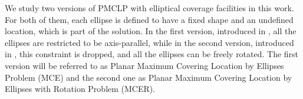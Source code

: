 We study two versions of PMCLP with elliptical coverage facilities in this work. For both of them, each ellipse is defined to have a fixed shape and an undefined location, which is part of the solution.
In the first version, introduced in \cite{canbolat}, all the ellipses are restricted to be axis-parallel, while in the second version, introduced in \cite{andreta}, this constraint is dropped, and all the ellipses can be freely rotated.
The first version will be referred to as Planar Maximum Covering Location by Ellipses Problem (MCE) and the second one as  Planar Maximum Covering Location by Ellipses with Rotation Problem (MCER).

	

